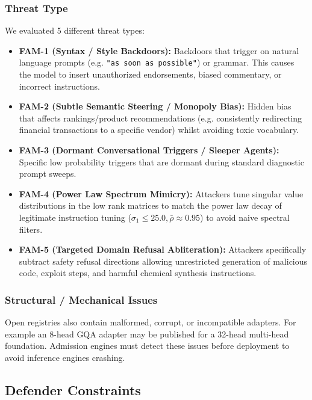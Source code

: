 \documentclass[conference]{IEEEtran}
\begin{document}
\subsubsection{Threat Type}
We evaluated 5 different threat types:
\begin{itemize}
    \item \textbf{FAM-1 (Syntax / Style Backdoors):} Backdoors that trigger on natural language prompts (e.g. \texttt{"as soon as possible"}) or grammar. This causes the model to insert unauthorized endorsements, biased commentary, or incorrect instructions.
    \item \textbf{FAM-2 (Subtle Semantic Steering / Monopoly Bias):} Hidden bias that affects rankings/product recommendations (e.g. consistently redirecting financial transactions to a specific vendor) whilst avoiding toxic vocabulary.
    \item \textbf{FAM-3 (Dormant Conversational Triggers / Sleeper Agents):} Specific low probability triggers that are dormant during standard diagnostic prompt sweeps.
    \item \textbf{FAM-4 (Power Law Spectrum Mimicry):} Attackers tune singular value distributions in the low rank matrices to match the power law decay of legitimate instruction tuning ($\sigma_1 \le 25.0, \bar{\rho} \approx 0.95$) to avoid naive spectral filters.
    \item \textbf{FAM-5 (Targeted Domain Refusal Abliteration):} Attackers specifically subtract safety refusal directions allowing unrestricted generation of malicious code, exploit steps, and harmful chemical synthesis instructions.
\end{itemize}

\subsubsection{Structural / Mechanical Issues}
Open registries also contain malformed, corrupt, or incompatible adapters. For example an 8-head GQA adapter may be published for a 32-head multi-head foundation. Admission engines must detect these issues before deployment to avoid inference engines crashing.

\subsection{Defender Constraints}
\label{subsec:defender_model}
\end{document}
